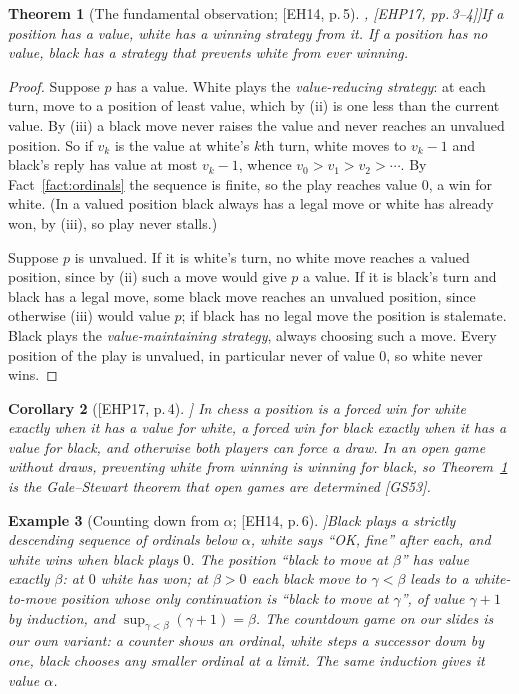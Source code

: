 \documentclass[10pt]{article}
\theoremstyle{notes}
\newtheorem{theorem}{Theorem}[section]
\newtheorem{corollary}[theorem]{Corollary}
\newtheorem{example}[theorem]{Example}
\newcommand{\EH}[1]{[EH14, #1]}
\newcommand{\EHP}[1]{[EHP17, #1]}
\begin{document}
\begin{theorem}[The fundamental observation; \EH{p.\,5}, \EHP{pp.\,3--4}]\label{thm:fundamental}
If a position has a value, white has a winning strategy from it. If a position has no value, black has a
strategy that prevents white from ever winning.
\end{theorem}

\begin{proof}
Suppose $p$ has a value. White plays the \emph{value-reducing strategy}: at each turn, move to a position of
least value, which by (ii) is one less than the current value. By (iii) a black move never raises the value and
never reaches an unvalued position. So if $v_k$ is the value at white's $k$th turn, white moves to $v_k-1$
and black's reply has value at most $v_k-1$, whence $v_0>v_1>v_2>\cdots$. By Fact~\ref{fact:ordinals} the
sequence is finite, so the play reaches value $0$, a win for white. (In a valued position black always has a
legal move or white has already won, by (iii), so play never stalls.)

Suppose $p$ is unvalued. If it is white's turn, no white move reaches a valued position, since by (ii) such a
move would give $p$ a value. If it is black's turn and black has a legal move, some black move reaches an
unvalued position, since otherwise (iii) would value $p$; if black has no legal move the position is
stalemate. Black plays the \emph{value-maintaining strategy}, always choosing such a move. Every position of
the play is unvalued, in particular never of value $0$, so white never wins.
\end{proof}

\begin{corollary}[\EHP{p.\,4}]
In chess a position is a forced win for white exactly when it has a value for white, a forced win for black
exactly when it has a value for black, and otherwise both players can force a draw. In an open game without
draws, preventing white from winning is winning for black, so Theorem~\ref{thm:fundamental} is the
Gale--Stewart theorem that open games are determined [GS53].
\end{corollary}

\begin{example}[Counting down from $\alpha$; \EH{p.\,6}]\label{ex:countdown}
Black plays a strictly descending sequence of ordinals below $\alpha$, white says ``OK, fine'' after each,
and white wins when black plays $0$. The position ``black to move at $\beta$'' has value exactly $\beta$: at
$0$ white has won; at $\beta>0$ each black move to $\gamma<\beta$ leads to a white-to-move position whose only
continuation is ``black to move at $\gamma$'', of value $\gamma+1$ by induction, and
$\sup_{\gamma<\beta}(\gamma+1)=\beta$. The countdown game on our slides is our own variant: a counter shows
an ordinal, white steps a successor down by one, black chooses any smaller ordinal at a limit. The same
induction gives it value $\alpha$.
\end{example}
\end{document}
